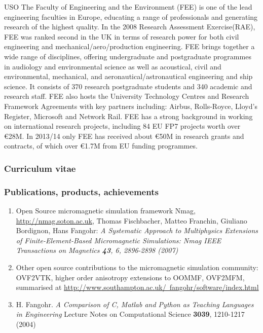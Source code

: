 \begin{sitedescription}{USO}
The Faculty of Engineering and the Environment (FEE) is one of the
lead engineering faculties in Europe, educating a range of
professionals and generating research of the highest quality. In the
2008 Research Assessment Exercise(RAE), FEE was ranked second in the
UK in terms of research power for both civil engineering and
mechanical/aero/production engineering. FEE brings together a wide
range of disciplines, offering undergraduate and postgraduate
programmes in audiology and environmental science as well as
acoustical, civil and environmental, mechanical, and
aeronautical/astronautical engineering and ship science. It consists
of 370 research postgraduate students and 340 academic and research
staff. FEE also hosts the University Technology Centres and Research
Framework Agreements with key partners including: Airbus, Rolls-Royce,
Lloyd’s Register, Microsoft and Network Rail. FEE has a strong
background in working on international research projects, including 84
EU FP7 projects worth over \euro 28M.  In 2013/14 only FEE has
received about \euro50M in research grants and contracts, of which
over \euro1.7M from EU funding programmes.



\subsubsection*{Curriculum vitae}



%
%

\subsubsection*{Publications, products, achievements}

\begin{enumerate}
\item Open Source micromagnetic simulation framework Nmag,
  \href{http://nmag.soton.ac.uk}{http://nmag.soton.ac.uk}, Thomas
  Fischbacher, Matteo Franchin, Giuliano Bordignon, Hans Fangohr: \emph{
A Systematic Approach to Multiphysics Extensions of Finite-Element-Based Micromagnetic Simulations: Nmag 
IEEE Transactions on Magnetics \textbf{43}, 6, 2896-2898 (2007)}
\item Other open source contributions to the micromagnetic simulation
  community: OVF2VTK, higher order anisotropy extensions to OOMMF,
  OVF2MFM, summarised at
  \href{http://www.southampton.ac.uk/~fangohr/software/index.html}{http://www.southampton.ac.uk/~fangohr/software/index.html} 
\item H. Fangohr.
\emph{A Comparison of C, Matlab and Python as Teaching Languages in Engineering}
Lecture Notes on Computational Science \textbf{3039}, 1210-1217 (2004)
\end{enumerate}


\end{sitedescription}
